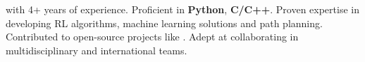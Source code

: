   \item{with 4+ years of experience. Proficient in \textbf{Python}, \textbf{C/C++}. Proven expertise in developing RL algorithms, machine learning solutions and path planning. Contributed to open-source projects like . Adept at collaborating in multidisciplinary and international teams.}
  \resumeSubHeadingListEnd
